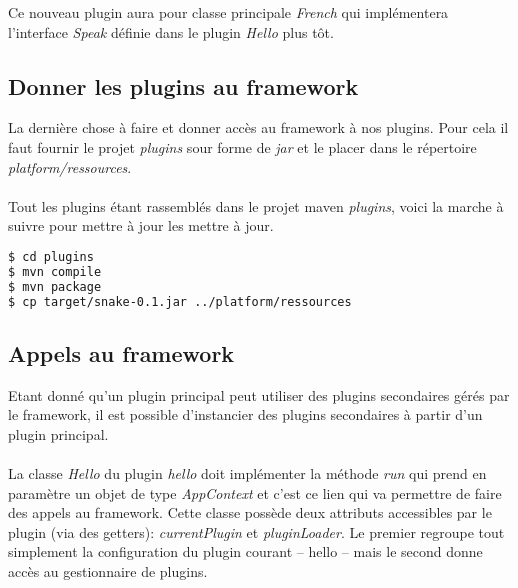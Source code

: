 \documentclass[12pt,a4paper]{article}
\begin{document}
Ce nouveau plugin aura pour classe principale \emph{French} qui implémentera 
l'interface \emph{Speak} définie dans le plugin \emph{Hello} plus tôt.
\lstset{language=bash,caption=FrenchSpeak plugin configuration}



\lstset{language=java,caption=FrenchSpeak plugin main class}


\subsection{Donner les plugins au framework}
La dernière chose à faire et donner accès au framework à nos plugins. Pour cela 
il faut fournir le projet \emph{plugins} sour forme de \emph{jar} et le placer 
dans le répertoire \emph{platform/ressources}.
\\\\
Tout les plugins étant rassemblés dans le projet maven \emph{plugins}, voici 
la marche à suivre pour mettre à jour les mettre à jour.

\begin{lstlisting}[language=bash,caption=Mise à jour des plugins]
$ cd plugins
$ mvn compile
$ mvn package
$ cp target/snake-0.1.jar ../platform/ressources
\end{lstlisting}

\subsection{Appels au framework}
Etant donné qu'un plugin principal peut utiliser des plugins secondaires gérés 
par le framework, il est possible d'instancier des plugins secondaires à 
partir d'un plugin principal.
\\\\
La classe \emph{Hello} du plugin \emph{hello} doit implémenter la méthode 
\emph{run} qui prend en paramètre un objet de type \emph{AppContext} et c'est 
ce lien qui va permettre de faire des appels au framework. 
Cette classe possède deux attributs accessibles par le plugin (via des getters):
\emph{currentPlugin} et \emph{pluginLoader}. Le premier regroupe tout simplement 
la configuration du plugin courant -- hello -- mais le second donne accès au 
gestionnaire de plugins.
\end{document}
